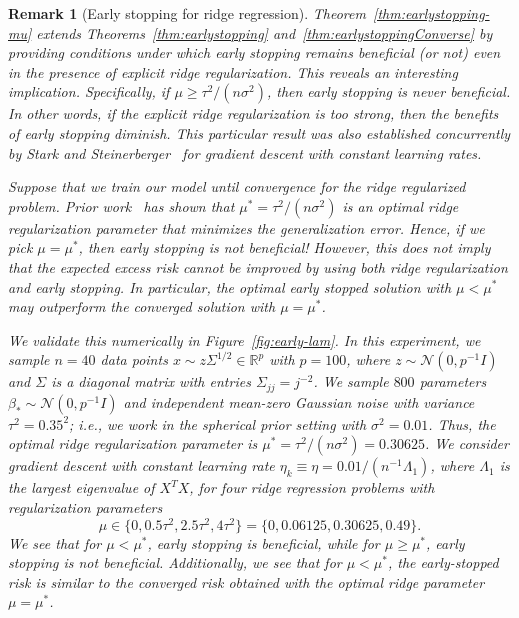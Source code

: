 \documentclass[11pt]{article}
\newtheorem{remark}{Remark}
\begin{document}
\begin{remark}[Early stopping for ridge regression] \label{rem:grokking-ridge} Theorem~\ref{thm:earlystopping-mu} extends Theorems~\ref{thm:earlystopping} and~\ref{thm:earlystoppingConverse} by providing conditions under which early stopping remains beneficial (or not) even in the presence of explicit ridge regularization. This reveals an interesting implication. Specifically, if $\mu \ge \tau^2 / (n \sigma^2)$, then early stopping is never beneficial. In other words, if the explicit ridge regularization is too strong, then the benefits of early stopping diminish. 
This particular result was also established concurrently by Stark and Steinerberger~\cite[Theorem~2.5]{StarkSteinerberger2025} for gradient descent with constant learning rates.

Suppose that we train our model until convergence for the ridge regularized problem. Prior work~\cite{nakkiran2021optimal} has shown that $\mu^* = \tau^2 / (n \sigma^2)$ is an optimal ridge regularization parameter that minimizes the generalization error.
Hence, if we pick $\mu = \mu^*$, then early stopping is not beneficial! However, this does not imply that the expected excess risk cannot be improved by using \emph{both} ridge regularization and early stopping. In particular, the optimal early stopped solution with $\mu < \mu^*$ may outperform the converged solution with $\mu = \mu^*$.

We validate this numerically in Figure~\ref{fig:early-lam}. In this experiment, we sample $n = 40$ data points $x \sim z \Sigma^{1/2} \in \mathbb{R}^{p}$ with $p=100$, where $z \sim \mathcal{N}(0, p^{-1} I)$ and $\Sigma$ is a diagonal matrix with entries $\Sigma_{jj} = j^{-2}$. We sample $800$ parameters $\beta_* \sim \mathcal{N}(0, p^{-1} I)$ and independent mean-zero Gaussian noise with variance $\tau^2 = 0.35^2$; i.e., we work in the spherical prior setting with $\sigma^2 = 0.01$. Thus, the optimal ridge regularization parameter is $\mu^* = \tau^2 / (n \sigma^2) = 0.30625$.
We consider gradient descent with constant learning rate $\eta_k \equiv \eta = 0.01 / (n^{-1} \Lambda_1)$, where $\Lambda_1$ is the largest eigenvalue of $X^T X$, for four ridge regression problems with regularization parameters
\[
    \mu \in \{ 0, 0.5 \tau^2, 2.5 \tau^2, 4 \tau^2 \}
    = \{ 0, 0.06125, 0.30625, 0.49 \}.
\]
We see that for $\mu < \mu^*$, early stopping is beneficial, while for $\mu \geq \mu^*$, early stopping is not beneficial. Additionally, we see that for $\mu < \mu^*$, the early-stopped risk is similar to the converged risk obtained with the optimal ridge parameter $\mu = \mu^*$.
\end{remark}
\end{document}
